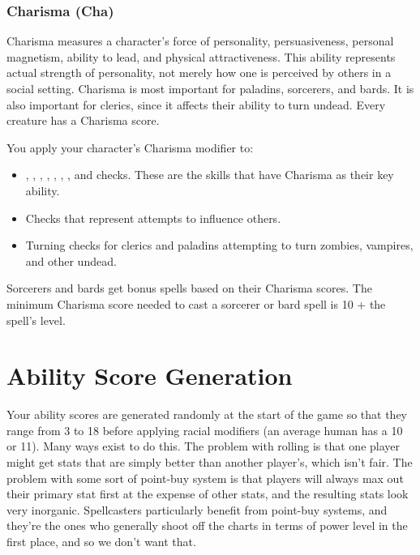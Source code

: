 \subsubsection{Charisma (Cha)}

Charisma measures a character's force of personality, persuasiveness, personal 
magnetism, ability to lead, and physical attractiveness. This ability represents 
actual strength of personality, not merely how one is perceived by others in a 
social setting. Charisma is most important for paladins, sorcerers, and bards. 
It is also important for clerics, since it affects their ability to turn undead. 
Every creature has a Charisma score.

You apply your character's Charisma modifier to:
\begin{itemize}
\item {}, , , , , , , 
and  checks. These are the skills that have Charisma as their key 
ability.
\item Checks that represent attempts to influence others. 
\item Turning checks for clerics and paladins attempting to turn zombies, vampires, and 
other undead.
\end{itemize}
Sorcerers and bards get bonus spells based on their Charisma scores. The minimum 
Charisma score needed to cast a sorcerer or bard spell is 10 + the spell's level.

\section{Ability Score Generation}

Your ability scores are generated randomly at the start of the game so that they range from 3 to 18 before applying racial modifiers (an average human has a 10 or 11). Many ways exist to do this. The problem with rolling is that one player might get stats that are simply better than another player's, which isn't fair. The problem with some sort of point-buy system is that players will always max out their primary stat first at the expense of other stats, and the resulting stats look very inorganic. Spellcasters particularly benefit from point-buy systems, and they're the ones who generally shoot off the charts in terms of power level in the first place, and so we don't want that.

